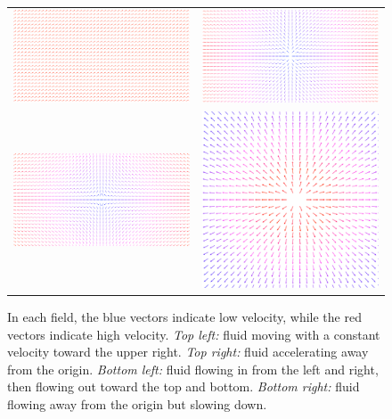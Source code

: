 \documentclass{myarticle}
\theoremstyle{nospace}
\newtheorem{old series theorem}{Theorem}
\newenvironment{series theorem}{\begin{mdframed}\begin{old series theorem}}{\end{old series theorem}\end{mdframed}}
\begin{document}
\begin{figure}[htb!] \centering
\begin{tabular}{cc}
\includegraphics[width=65mm]{data/velocityfield1.pdf} & \includegraphics[width=65mm]{data/velocityfield2.pdf} \\
\includegraphics[width=65mm]{data/velocityfield3.pdf} & \includegraphics[width=65mm]{data/velocityfield4.pdf} \\
\end{tabular}
\caption{In each field, the blue vectors indicate low velocity, while the red vectors indicate high velocity. \textit{Top left:} fluid moving with a constant velocity toward the upper right. \textit{Top right:} fluid accelerating away from the origin. \textit{Bottom left:} fluid flowing in from the left and right, then flowing out toward the top and bottom. \textit{Bottom right:} fluid flowing away from the origin but slowing down.}
\label{fig:velocity fields}
\end{figure}
\end{document}
